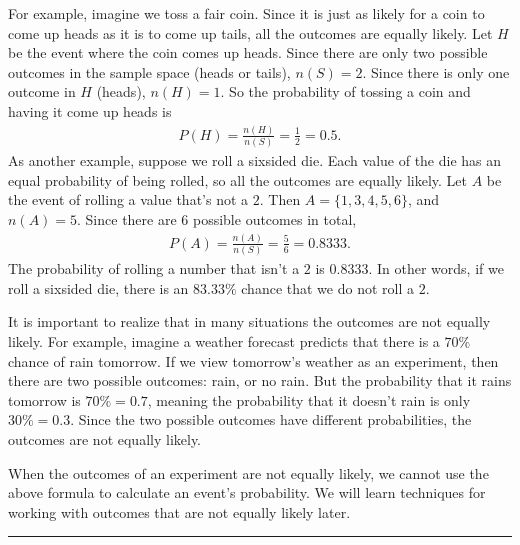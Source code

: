 \documentclass[letterpaper,10pt,english]{jupyterBook}
\begin{document}
\sphinxAtStartPar
For example, imagine we toss a fair coin. Since it is just as likely for a coin to come up heads as it is to come up tails, all the outcomes are equally likely. Let \(H\) be the event where the coin comes up heads. Since there are only two possible outcomes in the sample space (heads or tails), \(n(S) = 2\). Since there is only one outcome in \(H\) (heads), \(n(H) = 1\). So the probability of tossing a coin and having it come up heads is
\begin{equation*}
\begin{split} P(H) = \frac{n(H)}{n(S)} = \frac{1}{2} = 0.5. \end{split}
\end{equation*}
\sphinxAtStartPar
As another example, suppose we roll a six\sphinxhyphen{}sided die. Each value of the die has an equal probability of being rolled, so all the outcomes are equally likely. Let \(A\) be the event of rolling a value that’s not a \(2\). Then \(A = \{1, 3, 4, 5, 6\}\), and \(n(A) = 5\). Since there are \(6\) possible outcomes in total,
\begin{equation*}
\begin{split} P(A) = \frac{n(A)}{n(S)} = \frac{5}{6} = 0.8333. \end{split}
\end{equation*}
\sphinxAtStartPar
The probability of rolling a number that isn’t a \(2\) is \(0.8333\). In other words, if we roll a six\sphinxhyphen{}sided die, there is an \(83.33\%\) chance that we do not roll a \(2\).

\sphinxAtStartPar
It is important to realize that in many situations the outcomes are not equally likely. For example, imagine a weather forecast predicts that there is a \(70\%\) chance of rain tomorrow. If we view tomorrow’s weather as an experiment, then there are two possible outcomes: rain, or no rain. But the probability that it rains tomorrow is \(70\% = 0.7\), meaning the probability that it doesn’t rain is only \(30\% = 0.3\). Since the two possible outcomes have different probabilities, the outcomes are not equally likely.

\sphinxAtStartPar
When the outcomes of an experiment are not equally likely, we cannot use the above formula to calculate an event’s probability. We will learn techniques for working with outcomes that are not equally likely later.


\bigskip\hrule\bigskip
\end{document}
